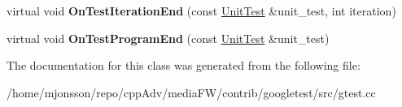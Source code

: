 \begin{DoxyCompactItemize}
\item 
\mbox{\label{classtesting_1_1internal_1_1TestEventRepeater_a94253e3c11753328e8a031f39352708f}} 
virtual void {\bfseries On\+Test\+Iteration\+End} (const \hyperlink{classtesting_1_1UnitTest}{Unit\+Test} \&unit\+\_\+test, int iteration)
\item 
\mbox{\label{classtesting_1_1internal_1_1TestEventRepeater_a4622616259747dbcc23f5ee39ef99ec0}} 
virtual void {\bfseries On\+Test\+Program\+End} (const \hyperlink{classtesting_1_1UnitTest}{Unit\+Test} \&unit\+\_\+test)
\end{DoxyCompactItemize}


The documentation for this class was generated from the following file\+:\begin{DoxyCompactItemize}
\item 
/home/mjonsson/repo/cpp\+Adv/media\+F\+W/contrib/googletest/src/gtest.\+cc\end{DoxyCompactItemize}
